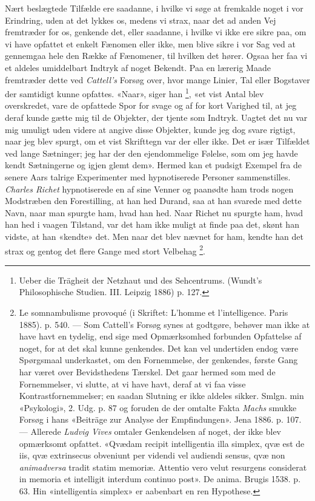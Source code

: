 \documentclass[12pt,a4paper,openany]{book}
\newcommand{\opage}[1]{\marginnote{\footnotesize\textit{[#1]}}}
\begin{document}
Nært beslægtede Tilfælde ere saadanne, i hvilke vi søge at fremkalde noget i
vor Erindring, uden at det lykkes os, medens vi strax, naar det ad anden Vej
fremtræder for os, genkende det, eller saadanne, i hvilke vi ikke ere sikre
paa, om vi have opfattet et enkelt Fænomen eller ikke, men blive sikre i vor
Sag ved at gennemgaa hele den Række af Fænomener, til hvilken det hører. Ogsaa
her faa vi et aldeles umiddelbart Indtryk af noget Bekendt. Paa en lærerig
Maade fremtræder dette ved \emph{Cattell's} Forsøg over, hvor mange Linier, Tal
eller Bogstaver der samtidigt kunne opfattes. «Naar», siger han%
\footnote[1]{Ueber die Trägheit der Netzhaut und des Sehcentrums. (Wundt's
Philosophische Studien. III. Leipzig 1886) p. 127.}, «et vist Antal blev
overskredet, vare de opfattede Spor for svage og af for kort Varighed til, at
jeg deraf kunde gætte mig til de Objekter, der tjente som Indtryk. Uagtet det
nu var mig umuligt uden videre at angive disse Objekter, kunde jeg dog svare
rigtigt, naar jeg blev spurgt, om et vist Skrifttegn var der eller ikke. Det er
især Tilfældet ved lange
\setcounter{footnote}{0}%
\opage{9}Sætninger; jeg har der den ejendommelige Følelse, som om jeg havde
kendt Sætningerne og igjen glemt dem». Hermed kan et pudsigt Exempel fra de
senere Aars talrige Experimenter med hypnotiserede Personer sammenstilles.
\emph{Charles Richet} hypnotiserede en af sine Venner og paanødte ham trods
nogen Modstræben den Forestilling, at han hed Durand, saa at han svarede med
dette Navn, naar man spurgte ham, hvad han hed. Naar Richet nu spurgte ham,
hvad han hed i vaagen Tilstand, var det ham ikke muligt at finde paa det, skønt
han vidste, at han «kendte» det. Men naar det blev nævnet for ham, kendte han
det strax og gentog det flere Gange med stort Velbehag%
\footnote[1]{Le somnambulisme provoqué (i Skriftet: L'homme et l'intelligence.
Paris 1885). p. 540. --- Som Cattell's Forsøg synes at godtgøre, behøver man
ikke at have havt en tydelig, end sige med Opmærksomhed forbunden Opfattelse af
noget, for at det skal kunne genkendes. Det kan vel undertiden endog være
Spørgsmaal underkastet, om den Fornemmelse, der genkendes, første Gang har
været over Bevidsthedens Tærskel. Det gaar hermed som med de Fornemmelser, vi
slutte, at vi have havt, deraf at vi faa visse Kontrastfornemmelser; en saadan
Slutning er ikke aldeles sikker. Smlgn. min «Psykologi», 2. Udg. p. 87 og
foruden de der omtalte Fakta \emph{Machs} smukke Forsøg i hans «Beiträge zur
Analyse der Empfindungen». Jena 1886. p. 107. --- Allerede \emph{Ludvig Vives}
omtaler Genkendelsen af noget, der ikke blev opmærksomt opfattet. «Qvædam
recipit intelligentia illa simplex, qvæ est de iis, qvæ extrinsecus obveniunt
per videndi vel audiendi sensus, qvæ non \emph{animadversa} tradit statim
memoriæ. Attentio vero velut resurgens considerat in memoria et intelligit
interdum continuo post». De anima. Brugis 1538. p. 63. Hin «intelligentia
simplex» er aabenbart en ren Hypothese.}.
\end{document}
